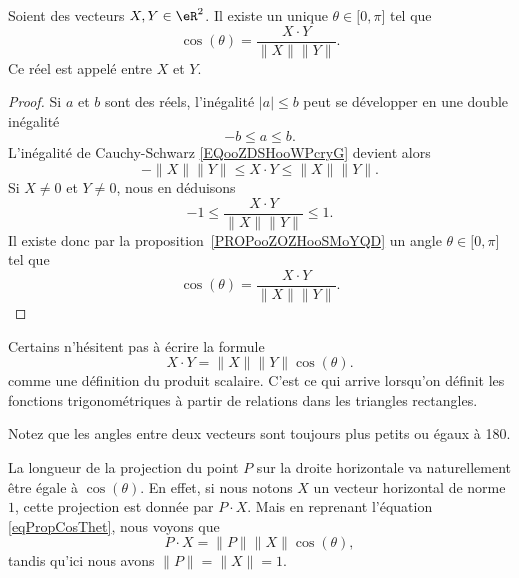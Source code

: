 \begin{propositionDef} \label{DEFooSVDZooPWHwFQ}
	Soient des vecteurs \( X,Y\in \eR^2\). Il existe un unique \( \theta\in \mathopen[ 0 , \pi \mathclose]\) tel que
	\begin{equation}		\label{eqDefAngleVect}
		\cos(\theta)=\frac{ X\cdot Y }{ \| X \|\| Y \| }.
	\end{equation}
	Ce réel est appelé  entre \( X\) et \( Y\).
\end{propositionDef}

\begin{proof}
	Si \( a\) et \( b\) sont des réels, l'inégalité \( | a |\leq b\) peut se développer en une double inégalité
	\begin{equation}
		-b\leq a\leq b.
	\end{equation}
	L'inégalité de Cauchy-Schwarz \eqref{EQooZDSHooWPcryG} devient alors
	\begin{equation}
		-\| X \|\| Y \|\leq X\cdot Y\leq\| X \|\| Y \|.
	\end{equation}
	Si \( X\neq 0\) et \( Y\neq 0\), nous en déduisons
	\begin{equation}
		-1\leq\frac{ X\cdot Y }{ \| X \|\| Y \| }\leq 1.
	\end{equation}
	Il existe donc par la proposition~\ref{PROPooZOZHooSMoYQD} un angle \( \theta\in\mathopen[ 0 , \pi \mathclose]\) tel que
	\begin{equation}
		\cos(\theta)=\frac{ X\cdot Y }{ \| X \|\| Y \| }.
	\end{equation}
\end{proof}

\begin{normaltext}
	Certains n'hésitent pas à écrire la formule
	\begin{equation}		\label{eqPropCosThet}
		X\cdot Y=\| X \|\| Y \|\cos(\theta).
	\end{equation}
	comme une définition du produit scalaire. C'est ce qui arrive lorsqu'on définit les fonctions trigonométriques à partir de relations dans les triangles rectangles.
\end{normaltext}

Notez que les angles entre deux vecteurs sont toujours plus petits ou égaux à \unit{180}{\degree}.

La longueur de la projection du point \( P\) sur la droite horizontale va naturellement être égale à \( \cos(\theta)\). En effet, si nous notons \( X\) un vecteur horizontal de norme \( 1\), cette projection est donnée par \( P\cdot X\). Mais en reprenant l'équation \eqref{eqPropCosThet}, nous voyons que
\begin{equation}
	P\cdot X=\| P \|\| X \|\cos(\theta),
\end{equation}
tandis qu'ici nous avons \( \| P \|=\| X \|=1\).

